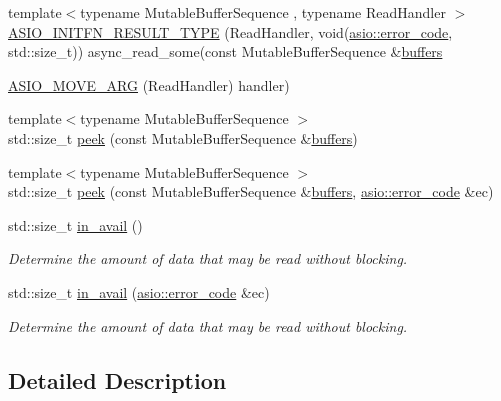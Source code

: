 \begin{DoxyCompactItemize}
\item 
{\footnotesize template$<$typename Mutable\+Buffer\+Sequence , typename Read\+Handler $>$ }\\\hyperlink{classasio_1_1buffered__write__stream_acd08b792b3a451dbca45263e543c2662}{A\+S\+I\+O\+\_\+\+I\+N\+I\+T\+F\+N\+\_\+\+R\+E\+S\+U\+L\+T\+\_\+\+T\+Y\+P\+E} (Read\+Handler, void(\hyperlink{classasio_1_1error__code}{asio\+::error\+\_\+code}, std\+::size\+\_\+t)) async\+\_\+read\+\_\+some(const Mutable\+Buffer\+Sequence \&\hyperlink{group__async__read_ga54dede45c3175148a77fe6635222c47d}{buffers}
\item 
\hyperlink{classasio_1_1buffered__write__stream_ad5ae94b6e1332b424c10a86871cd2ae5}{A\+S\+I\+O\+\_\+\+M\+O\+V\+E\+\_\+\+A\+R\+G} (Read\+Handler) handler)
\item 
{\footnotesize template$<$typename Mutable\+Buffer\+Sequence $>$ }\\std\+::size\+\_\+t \hyperlink{classasio_1_1buffered__write__stream_af405d792626b63386d1b2581b3f8a373}{peek} (const Mutable\+Buffer\+Sequence \&\hyperlink{group__async__read_ga54dede45c3175148a77fe6635222c47d}{buffers})
\item 
{\footnotesize template$<$typename Mutable\+Buffer\+Sequence $>$ }\\std\+::size\+\_\+t \hyperlink{classasio_1_1buffered__write__stream_a1a79234be08178c11ca81d173adccc62}{peek} (const Mutable\+Buffer\+Sequence \&\hyperlink{group__async__read_ga54dede45c3175148a77fe6635222c47d}{buffers}, \hyperlink{classasio_1_1error__code}{asio\+::error\+\_\+code} \&ec)
\item 
std\+::size\+\_\+t \hyperlink{classasio_1_1buffered__write__stream_a1e0fd46ecd1c6c661514415b25a848ac}{in\+\_\+avail} ()
\begin{DoxyCompactList}\small\item\em Determine the amount of data that may be read without blocking. \end{DoxyCompactList}\item 
std\+::size\+\_\+t \hyperlink{classasio_1_1buffered__write__stream_aab154b5c30ce124be72837110c18df81}{in\+\_\+avail} (\hyperlink{classasio_1_1error__code}{asio\+::error\+\_\+code} \&ec)
\begin{DoxyCompactList}\small\item\em Determine the amount of data that may be read without blocking. \end{DoxyCompactList}\end{DoxyCompactItemize}


\subsection{Detailed Description}
